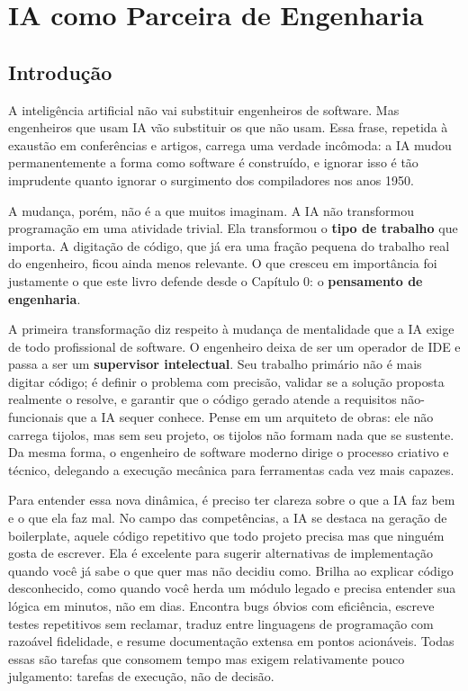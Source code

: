 \chapter{IA como Parceira de Engenharia}

\section{Introdução}

A inteligência artificial não vai substituir engenheiros de software. Mas
engenheiros que usam IA vão substituir os que não usam. Essa frase, repetida
à exaustão em conferências e artigos, carrega uma verdade incômoda: a IA
mudou permanentemente a forma como software é construído, e ignorar isso é
tão imprudente quanto ignorar o surgimento dos compiladores nos anos 1950.

A mudança, porém, não é a que muitos imaginam. A IA não transformou
programação em uma atividade trivial. Ela transformou o \textbf{tipo de
trabalho} que importa. A digitação de código, que já era uma fração pequena
do trabalho real do engenheiro, ficou ainda menos relevante. O que cresceu
em importância foi justamente o que este livro defende desde o Capítulo 0:
o \textbf{pensamento de engenharia}.

A primeira transformação diz respeito à mudança de mentalidade que a IA
exige de todo profissional de software. O engenheiro deixa de ser um operador de IDE
e passa a ser um \textbf{supervisor intelectual}. Seu trabalho primário não é mais
digitar código; é definir o problema com precisão, validar se a solução proposta
realmente o resolve, e garantir que o código gerado atende a requisitos não-funcionais
que a IA sequer conhece. Pense em um arquiteto de obras: ele não carrega tijolos, mas
sem seu projeto, os tijolos não formam nada que se sustente. Da mesma forma, o
engenheiro de software moderno dirige o processo criativo e técnico, delegando a
execução mecânica para ferramentas cada vez mais capazes.

Para entender essa nova dinâmica, é preciso ter clareza sobre o que a IA faz
bem e o que ela faz mal. No campo das competências, a IA se destaca na geração de
boilerplate, aquele código repetitivo que todo projeto precisa mas que ninguém gosta
de escrever. Ela é excelente para sugerir alternativas de implementação quando você já
sabe o que quer mas não decidiu como. Brilha ao explicar código desconhecido, como
quando você herda um módulo legado e precisa entender sua lógica em minutos, não em
dias. Encontra bugs óbvios com eficiência, escreve testes repetitivos sem reclamar,
traduz entre linguagens de programação com razoável fidelidade, e resume documentação
extensa em pontos acionáveis. Todas essas são tarefas que consomem tempo mas exigem
relativamente pouco julgamento: tarefas de execução, não de decisão.

